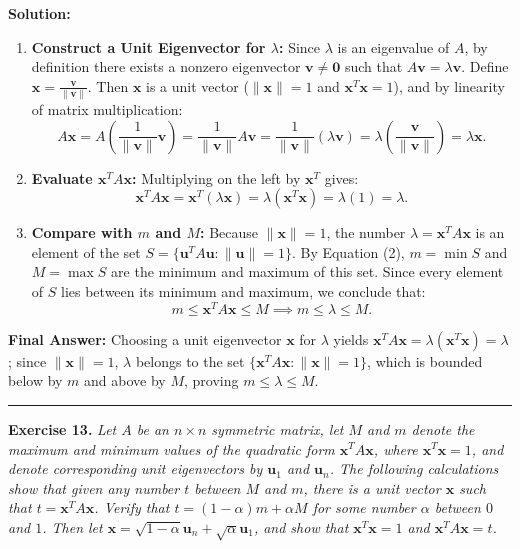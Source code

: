 \documentclass[11pt, letterpaper]{article}
\theoremstyle{definition}
\theoremstyle{remark}
\begin{document}
\textbf{Solution:}
\begin{enumerate}[label=\textbf{Step \arabic*:}]
    \item \textbf{Construct a Unit Eigenvector for $\lambda$:}
    Since $\lambda$ is an eigenvalue of $A$, by definition there exists a nonzero eigenvector $\mathbf{v} \ne \mathbf{0}$ such that $A\mathbf{v} = \lambda \mathbf{v}$. Define $\mathbf{x} = \frac{\mathbf{v}}{\|\mathbf{v}\|}$. Then $\mathbf{x}$ is a unit vector ($\|\mathbf{x}\| = 1$ and $\mathbf{x}^T\mathbf{x} = 1$), and by linearity of matrix multiplication:
    \[
    A\mathbf{x} = A\left(\frac{1}{\|\mathbf{v}\|}\mathbf{v}\right) = \frac{1}{\|\mathbf{v}\|}A\mathbf{v} = \frac{1}{\|\mathbf{v}\|}(\lambda \mathbf{v}) = \lambda \left(\frac{\mathbf{v}}{\|\mathbf{v}\|}\right) = \lambda \mathbf{x}.
    \]
    \item \textbf{Evaluate $\mathbf{x}^T A \mathbf{x}$:}
    Multiplying on the left by $\mathbf{x}^T$ gives:
    \[
    \mathbf{x}^T A \mathbf{x} = \mathbf{x}^T (\lambda \mathbf{x}) = \lambda (\mathbf{x}^T \mathbf{x}) = \lambda(1) = \lambda.
    \]
    \item \textbf{Compare with $m$ and $M$:}
    Because $\|\mathbf{x}\| = 1$, the number $\lambda = \mathbf{x}^T A \mathbf{x}$ is an element of the set $S = \{\mathbf{u}^T A \mathbf{u} : \|\mathbf{u}\| = 1\}$. By Equation (2), $m = \min S$ and $M = \max S$ are the minimum and maximum of this set. Since every element of $S$ lies between its minimum and maximum, we conclude that:
    \[
    m \le \mathbf{x}^T A \mathbf{x} \le M \implies m \le \lambda \le M.
    \]
\end{enumerate}
\textbf{Final Answer:} Choosing a unit eigenvector $\mathbf{x}$ for $\lambda$ yields $\mathbf{x}^T A \mathbf{x} = \lambda(\mathbf{x}^T\mathbf{x}) = \lambda$; since $\|\mathbf{x}\| = 1$, $\lambda$ belongs to the set $\{\mathbf{x}^T A \mathbf{x} : \|\mathbf{x}\| = 1\}$, which is bounded below by $m$ and above by $M$, proving $m \le \lambda \le M$.

\medskip
\hrule
\medskip

\textbf{Exercise 13.} \emph{Let $A$ be an $n \times n$ symmetric matrix, let $M$ and $m$ denote the maximum and minimum values of the quadratic form $\mathbf{x}^T A \mathbf{x}$, where $\mathbf{x}^T\mathbf{x} = 1$, and denote corresponding unit eigenvectors by $\mathbf{u}_1$ and $\mathbf{u}_n$. The following calculations show that given any number $t$ between $M$ and $m$, there is a unit vector $\mathbf{x}$ such that $t = \mathbf{x}^T A \mathbf{x}$. Verify that $t = (1-\alpha)m + \alpha M$ for some number $\alpha$ between $0$ and $1$. Then let $\mathbf{x} = \sqrt{1-\alpha}\mathbf{u}_n + \sqrt{\alpha}\mathbf{u}_1$, and show that $\mathbf{x}^T\mathbf{x} = 1$ and $\mathbf{x}^T A \mathbf{x} = t$.}
\end{document}

